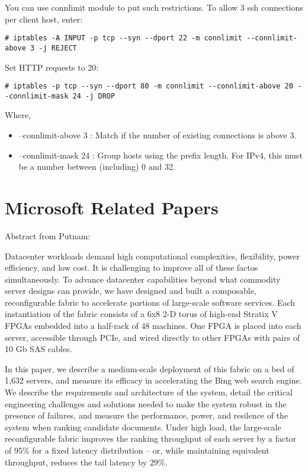 \documentclass[dvipdfm]{book}
\begin{document}
You can use connlimit module to put such restrictions. To allow 3 ssh connections per client host, enter:
\begin{verbatim}
# iptables -A INPUT -p tcp --syn --dport 22 -m connlimit --connlimit-above 3 -j REJECT
\end{verbatim}

Set HTTP requests to 20:
\begin{verbatim}
# iptables -p tcp --syn --dport 80 -m connlimit --connlimit-above 20 --connlimit-mask 24 -j DROP
\end{verbatim}
Where,
\begin{itemize}
\item –connlimit-above 3 : Match if the number of existing 
connections is above 3.
\item –connlimit-mask 24 : Group hosts using the prefix length. 
For IPv4, this must be a number between (including) 0 and 32.
\end{itemize}

\chapter{Microsoft Related Papers}
Abstract from Putnam\cite{15}:

Datacenter workloads demand high computational complexities,
flexibility, power efficiency, and low cost. It is challenging to
improve all of these factos simultaneously. To advance datacenter
capabilities beyond what commodity server designs can provide, we
have designed and built a composable, reconfigurable fabric to
accelerate portions of large-scale software services.
Each instantiation of the fabric consists of a 6x8 2-D torus of
high-end Stratix V FPGAs embedded into a half-rack of 48
machines. One FPGA is placed into each server, accessible through
PCIe, and wired directly to other FPGAs with pairs of 10 Gb SAS
cables.

In this paper, we describe a medium-scale deployment of
this fabric on a bed of 1,632 servers, and measure its efficacy in
accelerating the Bing web search engine. We describe the
requirements and architecture of the system, detail the
critical engineering challenges and solutions needed to make
the system robust in the presence of failures, and measure
the performance, power, and resilence of the system when
ranking candidate documents. Under high load, the
large-scale reconfigurable fabric improves the ranking throughput
of each server by a factor of 95\% for a fixed latency distribution --
or, while maintaining equivalent throughput, reduces the tail 
latency by 29\%.
\end{document}
